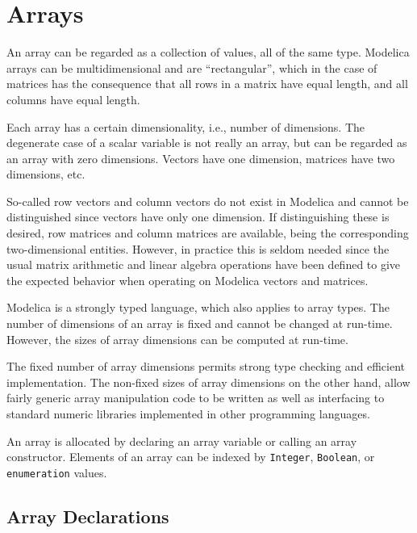 \chapter{Arrays}

An array can be regarded as a collection of values, all of the same
type. Modelica arrays can be multidimensional and are ``rectangular'',
which in the case of matrices has the consequence that all rows in a
matrix have equal length, and all columns have equal length.

Each array has a certain dimensionality, i.e., number of dimensions. The
degenerate case of a scalar variable is not really an array, but can be
regarded as an array with zero dimensions. Vectors have one dimension,
matrices have two dimensions, etc.

\begin{nonnormative}
So-called row vectors and column vectors do not exist in Modelica and cannot be distinguished since vectors have only one
dimension.  If distinguishing these is desired, row matrices and column matrices are available, being the corresponding
two-dimensional entities.  However, in practice this is seldom needed since the usual matrix arithmetic and linear algebra
operations have been defined to give the expected behavior when operating on Modelica vectors and matrices.
\end{nonnormative}

Modelica is a strongly typed language, which also applies to array
types. The number of dimensions of an array is fixed and cannot be
changed at run-time. However, the sizes of array dimensions can
be computed at run-time.

\begin{nonnormative}
The fixed number of array dimensions permits strong type checking and efficient implementation.  The non-fixed sizes of array
dimensions on the other hand, allow fairly generic array manipulation code to be written as well as interfacing to standard
numeric libraries implemented in other programming languages.
\end{nonnormative}

An array is allocated by declaring an array variable or calling an array
constructor. Elements of an array can be indexed by \lstinline!Integer!, \lstinline!Boolean!, or
\lstinline!enumeration! values.

\section{Array Declarations}

